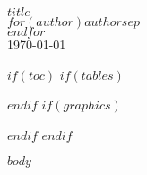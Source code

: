 \documentclass[11pt,a4paper]{article}
\makeatletter
\def\maxwidth{\ifdim\Gin@nat@width>\linewidth\linewidth
\else\Gin@nat@width\fi}
\let\Oldincludegraphics\includegraphics
\renewcommand{\includegraphics}[1]{\Oldincludegraphics[width=\maxwidth]{#1}}
\makeatother
\begin{document}
\begin{titlepage}
\begin{center}
\vspace*{3.5 cm}

\textsc{\huge \bfseries $title$}\\[0.4cm]
\textsc{\Large $for(author)$$author$$sep$ \\ $endfor$}\\[0.5cm]
\textsc{\Large \today}\\[0.5cm]


\end{center}
\end{titlepage}
\pagebreak

\maketitle

$if(toc)$
\tableofcontents
$if(tables)$
\listoftables
$endif$
$if(graphics)$
\listoffigures
$endif$
\pagebreak
$endif$

$body$
\end{document}

